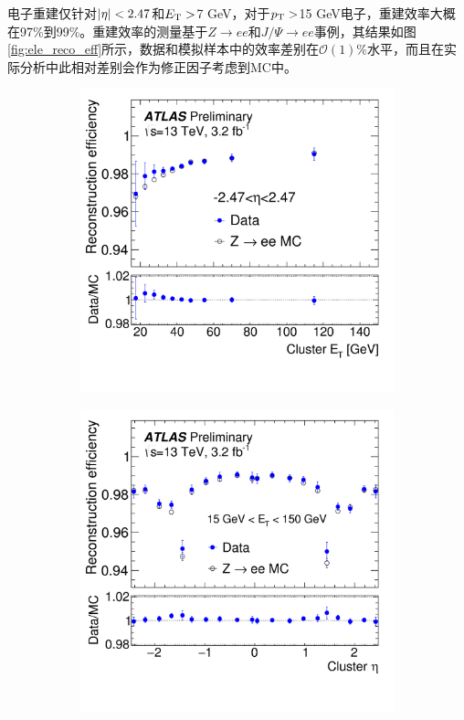 电子重建仅针对$|\eta|<2.47$和$E_{\text{T}} >$7 GeV，对于$p_{\text{T}}>$15 GeV电子，重建效率大概在97\%到99\%。重建效率的测量基于$Z\rightarrow ee$和$J/\Psi\rightarrow ee$事例\cite{ATLAS-CONF-2016-024}，其结果如图\ref{fig:ele_reco_eff}所示，数据和模拟样本中的效率差别在$\mathcal{O}(1)\%$水平，而且在实际分析中此相对差别会作为修正因子考虑到MC中。
\begin{figure}[h]
\begin{center}
\begin{subfigure}[b]{0.45\textwidth}
\centering
      \includegraphics[width=\textwidth]{fig/ele_reco_eff.png}
     \caption{}
      \label{fig:ele_reco_pt_eff}
  \end{subfigure}
 \begin{subfigure}[b]{0.45\textwidth}
 \centering
      \includegraphics[width=\textwidth]{fig/ele_reco_eta_eff.png}

\end{subfigure}
\end{center}
\end{figure}
